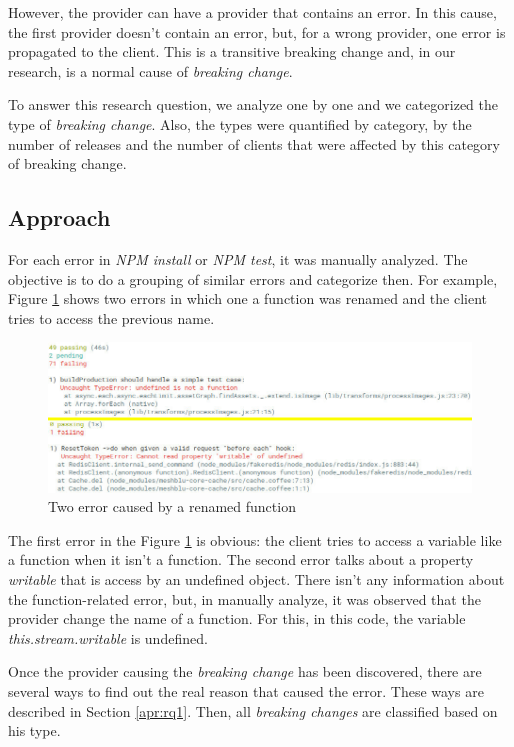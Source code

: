 However, the provider can have a provider that contains an error. In this cause, the first provider doesn't contain an error, but, for a wrong provider, one error is propagated to the client. This is a transitive breaking change and, in our research, is a normal cause of \textit{breaking change}.

To answer this research question, we analyze one by one and we categorized the type of \textit{breaking change}. Also, the types were quantified by category, by the number of releases and the number of clients that were affected by this category of breaking change.

\subsection{Approach}
\label{apr:rq2}

For each error in \textit{\Gls{NPM} install} or \textit{\Gls{NPM} test}, it was manually analyzed. The objective is to do a grouping of similar errors and categorize then. For example, Figure \ref{fig:error_category} shows two errors in which one a function was renamed and the client tries to access the previous name.

\begin{figure}[!h]
    \centering
    \includegraphics[scale=0.5]{figuras/error_category.jpeg}
    \caption{Two error caused by a renamed function}
    \label{fig:error_category}
\end{figure}

The first error in the Figure \ref{fig:error_category} is obvious: the client tries to access a variable like a function when it isn't a function. The second error talks about a property \textit{writable} that is access by an undefined object. There isn't any information about the function-related error, but, in manually analyze, it was observed that the provider change the name of a function. For this, in this code, the variable \textit{this.stream.writable} is undefined.

Once the provider causing the \textit{breaking change} has been discovered, there are several ways to find out the real reason that caused the error. These ways are described in Section \ref{apr:rq1}. Then, all \textit{breaking changes} are classified based on his type.

